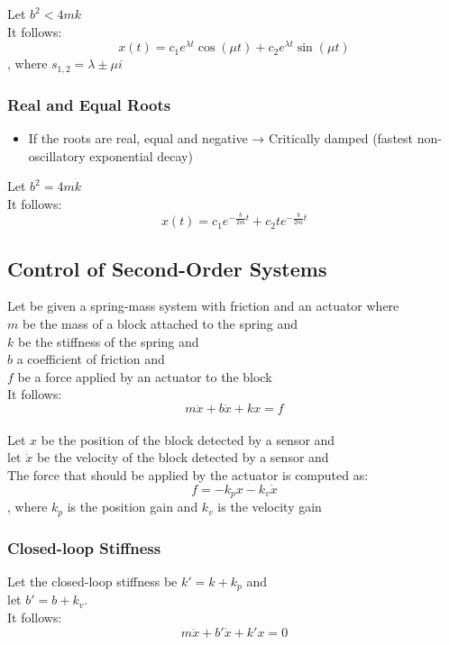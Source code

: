 \documentclass[10pt,a4paper]{article}
\begin{document}
Let $b^2 < 4mk$ \\
It follows:
$$
x(t) = c_1e^{\lambda t}\cos(\mu t) + c_2e^{\lambda t} \sin(\mu t)
$$
, where $s_{1,2} = \lambda \pm \mu i$ \\

\subsubsection{Real and Equal Roots}
\begin{itemize}
	\item If the roots are real, equal and negative → Critically damped (fastest non-oscillatory exponential decay)
\end{itemize}

Let $b^2 = 4 mk$ \\
It follows:
$$
x(t) = c_1 e^{-\frac{b}{2m}t} + c_2 t e^{-\frac{b}{2m}t}
$$

\subsection{Control of Second-Order Systems}

Let be given a spring-mass system with friction and an actuator where \\
$m$ be the mass of a block attached to the spring and \\
$k$ be the stiffness of the spring and \\
$b$ a coefficient of friction and \\
$f$ be a force applied by an actuator to the block \\
It follows:
$$
m\ddot x + b \dot x + k x = f
$$
\\

Let $x$ be the position of the block detected by a sensor and \\
let $\dot x$ be the velocity of the block detected by a sensor and \\
The force that should be applied by the actuator is computed as:
$$
f = -k_px - k_v \dot x
$$
, where $k_p$ is the position gain and $k_v$ is the velocity gain

\subsubsection{Closed-loop Stiffness}
Let the closed-loop stiffness be $k' = k + k_p$ and \\
let $b' = b + k_v$. \\
It follows:
$$
m\ddot x + b' \dot x + k' x = 0
$$
\end{document}
